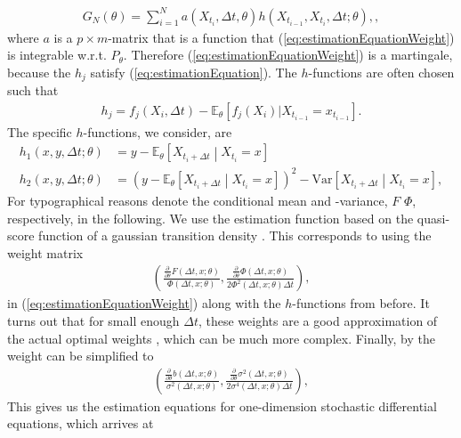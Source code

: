 \begin{align}
    G_N(\theta) = \sum_{i = 1}^N a\left(X_{t_i}, \Delta t, \theta \right)h(X_{t_{i - 1}}, X_{t_i}, \Delta t; \theta), \label{eq:estimationEquationWeight},
\end{align}
where $a$ is a $p\times m$-matrix that is a function that (\ref{eq:estimationEquationWeight}) is integrable w.r.t. $P_\theta$. Therefore (\ref{eq:estimationEquationWeight}) is a martingale, because the $h_j$ satisfy (\ref{eq:estimationEquation}). The $h$-functions are often chosen such that
\begin{align}
    h_j = f_j(X_i, \Delta t) - \mathbb{E}_\theta\left[f_j(X_i)| X_{t_{i - 1}} = x_{t_{i - 1}}\right].
\end{align}
The specific $h$-functions, we consider, are
\begin{align}
    h_1(x,y, \Delta t; \theta) &= y - \mathbb{E}_\theta\left[X_{t_i + \Delta t} \middle| X_{t_{i}} = x\right] \\
    h_2(x,y, \Delta t; \theta) &= \left(y - \mathbb{E}_\theta\left[X_{t_i + \Delta t} \middle| X_{t_{i}} = x\right]\right)^2 - \mathrm{Var}\left[X_{t_i + \Delta t} \middle| X_{t_{i}} = x\right],
\end{align}
For typographical reasons denote the conditional mean and -variance, $F$ $\Phi$, respectively, in the following.
 We use the estimation function based on the quasi-score function of a gaussian transition density \cite[equation (1.28)]{StatisticalMethodsForSDE}. This corresponds to using the weight matrix
 \begin{align}
    \left(\frac{\frac{\partial}{\partial\theta}F(\Delta t, x;\theta)}{\Phi\left(\Delta t, x; \theta\right)} , \frac{\frac{\partial}{\partial\theta}\Phi(\Delta t, x;\theta)}{2\Phi^2(\Delta t, x;\theta)\Delta t} \right),
\end{align}
in (\ref{eq:estimationEquationWeight}) along with the $h$-functions from before. It turns out that for small enough $\Delta t$, these weights are a good approximation of the actual optimal weights \cite[equation (1.32)]{StatisticalMethodsForSDE}, which can be much more complex. Finally, by \cite[lemma 1.10]{StatisticalMethodsForSDE} the weight can be simplified to
\begin{align}
    \left(\frac{\frac{\partial}{\partial\theta}b(\Delta t, x;\theta)}{\sigma^2\left(\Delta t, x; \theta\right)} , \frac{\frac{\partial}{\partial\theta}\sigma^2(\Delta t, x;\theta)}{2\sigma^4(\Delta t, x;\theta)\Delta t} \right),
\end{align}
This gives us the estimation equations for one-dimension stochastic differential equations, which \cite[Example 1.11]{StatisticalMethodsForSDE} arrives at
